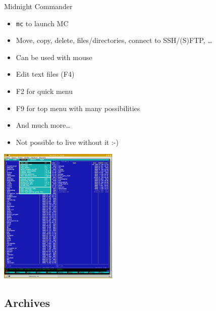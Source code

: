 \documentclass[hyperref={bookmarks=true, unicode=true, colorlinks=true, pdftitle={Linux, command line and MetaCentrum}, plainpages=false, pdfauthor={Vojtech Zeisek}, pdfsubject={Course about use of Linux command line, writing shell scripts and using MetaCentrum of CESNET}, pdfcreator={XeLaTeX, http://www.xelatex.org/}, pdfkeywords={Linux, GNU, BASH, shell, command line, MetaCentrum}, linkcolor=Sienna, anchorcolor=black, citecolor=green, filecolor=magenta, menucolor=Sienna, urlcolor=cyan, pdftex}, compress, ucs, xelatex, xcolor=svgnames, 11pt]{beamer}
\begin{document}
\begin{frame}{Midnight Commander}
\begin{multicols}{2}
\begin{itemize}
  \item \texttt{mc} to launch MC
  \item Move, copy, delete, files/directories, connect to SSH/(S)FTP, \ldots
  \item Can be used with mouse
  \item Edit text files (F4)
  \item F2 for quick menu
  \item F9 for top menu with many possibilities
  \item And much more\ldots
  \item Not possible to live without it :-)
\end{itemize}
\includegraphics[height=6.5cm]{mc.png}
\end{multicols}
\end{frame}

\subsection{Archives}
\end{document}
